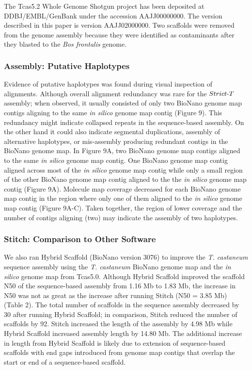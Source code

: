 \documentclass{bmcart}
\begin{document}
The Tcas5.2 Whole Genome Shotgun project has been deposited at DDBJ/EMBL/GenBank under the accession AAJJ00000000. The version described in this paper is version AAJJ02000000. Two scaffolds were removed from the genome assembly because they were identified as contaminants after they blasted to the \textit{Bos frontalis} genome.

\subsubsection*{Assembly: Putative Haplotypes}

Evidence of putative haplotypes was found during visual inspection of alignments. Although overall alignment redundancy was rare for the $Strict\textnormal{-}T$ assembly; when observed, it usually consisted of only two BioNano genome map contigs aligning to the same \textit{in silico} genome map contig (Figure 9). This redundancy might indicate collapsed repeats in the sequence-based assembly. On the other hand it could also indicate segmental duplications, assembly of alternative haplotypes, or mis-assembly producing redundant contigs in the BioNano genome map. In Figure 9A, two BioNano genome map contigs aligned to the same \textit{in silico} genome map contig. One BioNano genome map contig aligned across most of the \textit{in silico} genome map contig while only a small region of the other BioNano genome map contig aligned to the the \textit{in silico} genome map contig (Figure 9A). Molecule map coverage decreased for each BioNano genome map contig in the region where only one of them aligned to the \textit{in silico} genome map contig (Figure 9A-C). Taken together, the region of lower coverage and the number of contigs aligning (two) may indicate the assembly of two haplotypes. 

\subsubsection*{Stitch: Comparison to Other Software}

We also ran Hybrid Scaffold (BioNano version 3076) to improve the \textit{T. castaneum} sequence assembly using the \textit{T. castaneum} BioNano genome map and the \textit{in silico} genome map from Tcas5.0. Although Hybrid Scaffold improved the scaffold N50 of the sequence-based assembly from 1.16 Mb to 1.83 Mb, the increase in N50 was not as great as the increase after running Stitch (N50 = 3.85 Mb) (Table 2). The total number of scaffolds in the sequence assembly decreased by 30 after running Hybrid Scaffold; in comparison, Stitch reduced the number of scaffolds by 92. Stitch increased the length of the assembly by 4.98 Mb while Hybrid Scaffold increased assembly length by 14.80 Mb. The additional increase in length from Hybrid Scaffold is likely due to extension of sequence-based scaffolds with end gaps introduced from genome map contigs that overlap the start or end of a sequence-based scaffold. 
\end{document}
